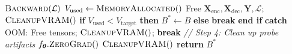 \documentclass[11pt]{article}
\begin{document}
\begin{algorithm}[t]
\begin{algorithmic}[1]
    \State \hspace{\algorithmicindent} $\textsc{Backward}(\mathcal{L})$
    \State \hspace{\algorithmicindent} $V_{\text{used}} \gets \textsc{MemoryAllocated}()$
    \State \hspace{\algorithmicindent} Free $\mathbf{X}_{\text{enc}}, \mathbf{X}_{\text{dec}}, \mathbf{Y}, \mathcal{L}$;
        $\textsc{CleanupVRAM}()$
    \State \hspace{\algorithmicindent} \textbf{if} $V_{\text{used}} < V_{\text{target}}$ \textbf{then}
    \State \hspace{\algorithmicindent}\hspace{\algorithmicindent} $B^* \gets B$
    \State \hspace{\algorithmicindent} \textbf{else}
    \State \hspace{\algorithmicindent}\hspace{\algorithmicindent} \textbf{break}
    \State \hspace{\algorithmicindent} \textbf{end if}
    \State \textbf{catch} OOM:
    \State \hspace{\algorithmicindent} Free tensors; $\textsc{CleanupVRAM}()$;
        \textbf{break}
\EndFor
\Statex
\Statex \hspace{\algorithmicindent}\textit{// Step 4: Clean up probe artifacts}
\State $f_{\boldsymbol{\theta}}.\textsc{ZeroGrad}()$
\State $\textsc{CleanupVRAM}()$
\State \textbf{return} $B^*$
\end{algorithmic}
\end{algorithm}
\end{document}
